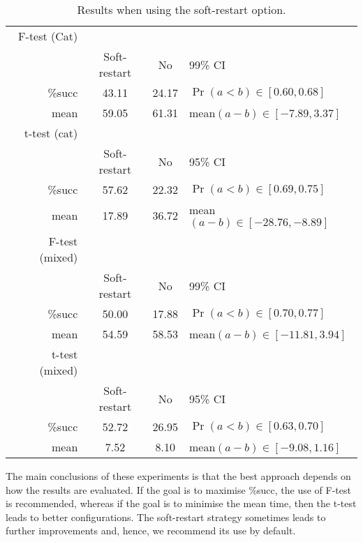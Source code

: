 \begin{table}[tp]
  \caption{Results when using the soft-restart option.}
  \label{tab:softrestart}
  \centering
  \begin{tabular}{rccl}
    \toprule
F-test (Cat)\\
           & Soft-restart & No  & 99\% CI\\\midrule
    \%succ & 43.11&24.17 &  $\Pr(a < b) \in [0.60,  0.68]$\\
    mean   & 59.05&61.31 &  mean$(a-b) \in [-7.89, 3.37]$\\
\midrule
t-test (cat)\\
           & Soft-restart & No  & 95\% CI\\\midrule
    \%succ & 57.62 & 22.32 & $\Pr(a < b) \in[0.69,  0.75]$\\
    mean   & 17.89 & 36.72 & mean$(a-b) \in [-28.76, -8.89]$\\
\midrule
F-test (mixed)\\
    & Soft-restart & No  & 99\% CI\\\midrule
    \%succ &50.00 &17.88& $\Pr(a < b) \in [0.70, 0.77]$\\
    mean   &54.59 &58.53& mean$(a-b) \in  [-11.81, 3.94]$\\
\midrule
t-test (mixed)\\
           & Soft-restart & No  & 95\% CI\\\midrule
    \%succ & 52.72 &26.95& $\Pr(a < b) \in[0.63, 0.70]$\\
    mean   &  7.52 & 8.10& mean$(a-b) \in [-9.08, 1.16]$\\

\bottomrule
\end{tabular}
\end{table}

The main conclusions of these experiments is that the best approach
depends on how the results are evaluated. If the goal is to maximise
\%succ, the use of F-test is recommended, whereas if the goal is to
minimise the mean time, then the t-test leads to better
configurations. The soft-restart strategy sometimes leads to further
improvements and, hence, we recommend its use by default.


